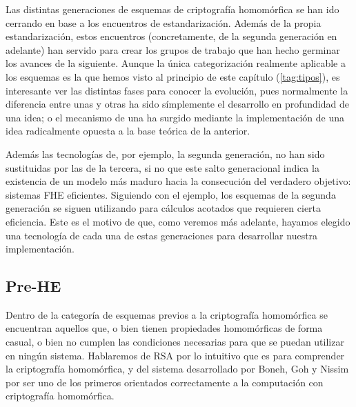 Las distintas generaciones de esquemas de criptografía homomórfica se han ido cerrando en base a los encuentros de estandarización. Además de la propia estandarización, estos encuentros (concretamente, de la segunda generación en adelante) han servido para crear los grupos de trabajo que han hecho germinar los avances de la siguiente. Aunque la única categorización realmente aplicable a los esquemas es la que hemos visto al principio de este capítulo (\ref{tag:tipos}), es interesante ver las distintas fases para conocer la evolución, pues normalmente la diferencia entre unas y otras ha sido símplemente el desarrollo en profundidad de una idea; o el mecanismo de una ha surgido mediante la implementación de una idea radicalmente opuesta a la base teórica de la anterior.


Además las tecnologías de, por ejemplo, la segunda generación, no han sido sustituidas por las de la tercera, si no que este salto generacional indica la existencia de un modelo más maduro hacia la consecución del verdadero objetivo: sistemas FHE eficientes. Siguiendo con el ejemplo, los esquemas de la segunda generación se siguen utilizando para cálculos acotados que requieren cierta eficiencia. Este es el motivo de que, como veremos más adelante, hayamos elegido una tecnología de cada una de estas generaciones para desarrollar nuestra implementación.

\subsection{Pre-HE}

Dentro de la categoría de esquemas previos a la criptografía homomórfica se encuentran aquellos que, o bien tienen propiedades homomórficas de forma casual, o bien no cumplen las condiciones necesarias para que se puedan utilizar en ningún sistema. Hablaremos de RSA por lo intuitivo que es para comprender la criptografía homomórfica, y del sistema desarrollado por Boneh, Goh y Nissim por ser uno de los primeros orientados correctamente a la computación con criptografía homomórfica.

